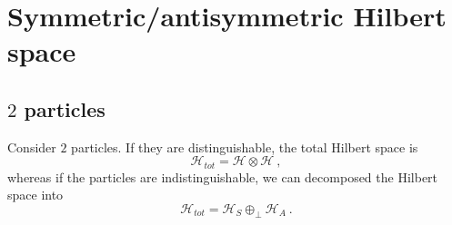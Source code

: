 \section{Symmetric/antisymmetric Hilbert space} 

\subsection{$2$ particles}

    Consider $2$ particles. If they are distinguishable, the total Hilbert space is 
    \begin{equation*}
        \mathcal H_{tot} = \mathcal H \otimes \mathcal H ~,
    \end{equation*}
    whereas if the particles are indistinguishable, we can decomposed the Hilbert space into
    \begin{equation*}
        \mathcal H_{tot} = \mathcal H_S \oplus_\perp  \mathcal H_A ~.
    \end{equation*} 
